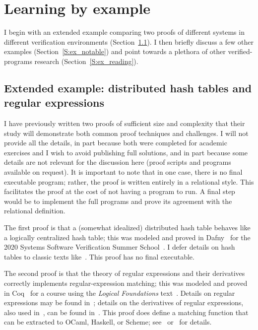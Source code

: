 \section{Learning by example}\label{S:examples}


I begin with an extended example comparing two proofs of different systems in
different verification environments (Section~\ref{S:ex_ext}). I then briefly
discuss a few other examples (Section~\ref{S:ex_notable}) and point towards a
plethora of other verified-programs research (Section~\ref{S:ex_reading}).

\subsection{Extended example: distributed hash tables and regular
expressions}\label{S:ex_ext}

I have previously written two proofs of sufficient size and complexity that
their study will demonstrate both common proof techniques and challenges. I will
not provide all the details, in part because both were completed for academic
exercises and I wish to avoid publishing full solutions, and in part because
some details are not relevant for the discussion here (proof scripts and
programs available on request). It is important to note that in one case, there
is no final executable program; rather, the proof is written entirely in a
relational style. This facilitates the proof at the cost of not having a program
to run. A final step would be to implement the full programs and prove its
agreement with the relational definition.

The first proof is that a (somewhat idealized) distributed hash table behaves
like a logically centralized hash table; this was modeled and proved in
Dafny~\cite{leino2010dafny} for the 2020 Systems Software Verification Summer
School~\cite{Kapritsos_2020}. I defer details on hash tables to classic texts
like~\cite{CLRS}. This proof has no final executable.

The second proof is that the theory of regular expressions and their derivatives
correctly implements regular-expression matching; this was modeled and proved in
Coq~\cite{Coq} for a course using the \emph{Logical Foundations}
text~\cite{Pierce:SF1}. Details on regular expressions may be found
in~\cite{Lewis_1997,Morrisett_2012}; details on the derivatives of regular
expressions, also used in~\cite{Pierce:SF1,Morrisett_2012}, can be found
in~\cite{Might_Yacc,Might_desugar,Might_deriv}. This proof does define a
matching function that can be extracted to OCaml, Haskell, or Scheme;
see~\cite{Coq_Extract} or~\cite[Extraction]{Pierce:SF1} for details.

